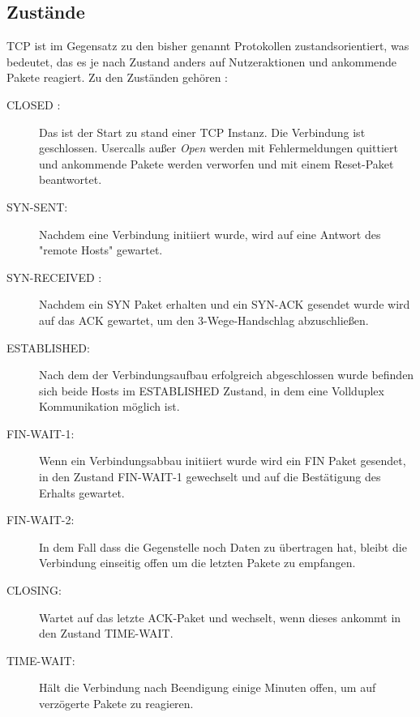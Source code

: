 \subsection{Zustände}
TCP ist im Gegensatz zu den bisher genannt Protokollen zustandsorientiert, was bedeutet, das es je nach Zustand anders auf Nutzeraktionen und ankommende Pakete reagiert. 
Zu den Zuständen gehören :

\begin{description}

\item[CLOSED : ]Das ist der Start zu stand einer TCP Instanz. Die Verbindung ist geschlossen. Usercalls außer \textit{Open} werden mit Fehlermeldungen quittiert und ankommende Pakete werden verworfen und mit einem Reset-Paket beantwortet.
\item[SYN-SENT: ]Nachdem eine Verbindung initiiert wurde, wird auf eine Antwort des {}"remote Hosts"{} gewartet. 
\item[SYN-RECEIVED : ] Nachdem ein SYN Paket erhalten und ein SYN-ACK gesendet wurde wird auf das ACK gewartet, um den 3-Wege-Handschlag abzuschließen. 
\item[ESTABLISHED: ] Nach dem der Verbindungsaufbau erfolgreich abgeschlossen wurde befinden sich beide Hosts im ESTABLISHED Zustand, in dem eine Vollduplex Kommunikation möglich ist. 
\item[FIN-WAIT-1: ] Wenn ein Verbindungsabbau initiiert wurde wird ein FIN Paket gesendet, in den Zustand FIN-WAIT-1 gewechselt und auf die Bestätigung des Erhalts gewartet. 
\item[FIN-WAIT-2: ] In dem Fall dass die Gegenstelle noch Daten zu übertragen hat, bleibt die Verbindung einseitig offen um die letzten Pakete zu empfangen. 
\item[CLOSING: ]	Wartet auf das letzte ACK-Paket und wechselt, wenn dieses ankommt in den Zustand TIME-WAIT.
\item[TIME-WAIT: ] Hält die Verbindung nach Beendigung einige Minuten offen, um auf verzögerte Pakete zu reagieren.
\end{description}
